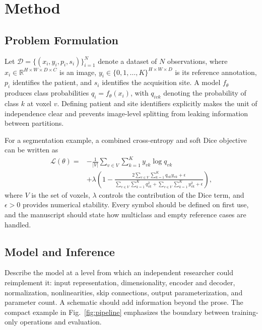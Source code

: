 \section{Method}
\label{sec:method}

\subsection{Problem Formulation}

Let $\mathcal{D}=\{(x_i,y_i,p_i,s_i)\}_{i=1}^{N}$ denote a dataset of $N$
observations, where $x_i\in\mathbb{R}^{H\times W\times D\times C}$ is an image,
$y_i\in\{0,1,\ldots,K\}^{H\times W\times D}$ is its reference annotation,
$p_i$ identifies the patient, and $s_i$ identifies the acquisition site.  A
model $f_{\theta}$ produces class probabilities
$q_i=f_{\theta}(x_i)$, with $q_{ivk}$ denoting the probability of class $k$ at
voxel $v$.  Defining patient and site identifiers explicitly makes the unit of
independence clear and prevents image-level splitting from leaking information
between partitions.

For a segmentation example, a combined cross-entropy and soft Dice objective
can be written as
\begin{equation}
\label{eq:loss}
\begin{array}{rl}
\displaystyle \mathcal{L}(\theta)={}
&\displaystyle -\frac{1}{|V|}\sum_{v\in V}\sum_{k=1}^{K} y_{vk}\log q_{vk} \\[2pt]
&\displaystyle +\lambda\left(1-
\frac{2\sum_{v\in V}\sum_{k=1}^{K}q_{vk}y_{vk}+\epsilon}
{\sum_{v\in V}\sum_{k=1}^{K}q_{vk}^{2}
+\sum_{v\in V}\sum_{k=1}^{K}y_{vk}^{2}+\epsilon}\right),
\end{array}
\end{equation}
where $V$ is the set of voxels, $\lambda$ controls the contribution of the Dice
term, and $\epsilon>0$ provides numerical stability.  Every symbol should be
defined on first use, and the manuscript should state how multiclass and empty
reference cases are handled.

\subsection{Model and Inference}

Describe the model at a level from which an independent researcher could
reimplement it: input representation, dimensionality, encoder and decoder,
normalization, nonlinearities, skip connections, output parameterization, and
parameter count.  A schematic should add information beyond the prose.  The
compact example in Fig.~\ref{fig:pipeline} emphasizes the boundary between
training-only operations and evaluation.

